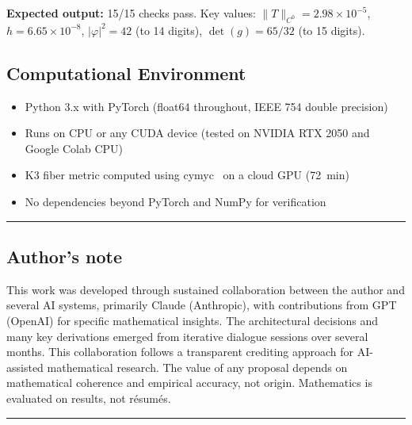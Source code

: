 \documentclass[11pt,a4paper]{article}
\newcommand{\norm}[1]{\|#1\|}
\theoremstyle{remark}
\begin{document}
\textbf{Expected output:} 15/15 checks pass. Key values: $\norm{T}_{C^0} = 2.98 \times 10^{-5}$,
$h = 6.65 \times 10^{-8}$, $|\varphi|^2 = 42$ (to 14 digits), $\det(g) = 65/32$ (to 15 digits).

\subsection{Computational Environment}\label{sec:environment}

\begin{itemize}
    \item Python 3.x with PyTorch (float64 throughout, IEEE 754 double precision)
    \item Runs on CPU or any CUDA device (tested on NVIDIA RTX 2050 and Google Colab CPU)
    \item K3 fiber metric computed using cymyc~\cite{cymyc} on a cloud GPU (72~min)
    \item No dependencies beyond PyTorch and NumPy for verification
\end{itemize}


\vspace{1em}
\noindent\rule{\textwidth}{0.2pt}

\subsection*{Author's note}

This work was developed through sustained collaboration between the author and several AI systems, primarily Claude (Anthropic), with contributions from GPT (OpenAI) for specific mathematical insights. The architectural decisions and many key derivations emerged from iterative dialogue sessions over several months. This collaboration follows a transparent crediting approach for AI-assisted mathematical research. The value of any proposal depends on mathematical coherence and empirical accuracy, not origin. Mathematics is evaluated on results, not r\'esum\'es.

\vspace{1em}
\noindent\rule{\textwidth}{0.2pt}

\end{document}
